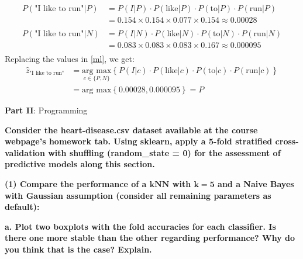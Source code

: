 \documentclass[12pt]{article}
\begin{document}
\begin{enumerate}[leftmargin=\labelsep]
    \begin{equation*}
        \begin{aligned}
            P(\text{"I like to run"}|P) &= P(I|P) \cdot P(\text{like}|P) \cdot P(\text{to}|P) \cdot P(\text{run}|P) \\
            &= 0.154 \times 0.154 \times 0.077 \times 0.154 \approx 0.00028\\
            \\
            P(\text{"I like to run"}|N) &= P(I|N) \cdot P(\text{like}|N) \cdot P(\text{to}|N) \cdot P(\text{run}|N) \\
            &= 0.083 \times 0.083 \times 0.083 \times 0.167 \approx 0.000095\\
        \end{aligned}
    \end{equation*}
    \vspace{10pt}
    Replacing the values in \eqref{ml}, we get:
    \begin{equation*}
        \begin{aligned}
            \hat{z}_{\text{"I like to run"}} &= \underset{c \in \{P,N\}}{\text{arg max}} \left\{P(I | c) \cdot P(\text{like}| c) \cdot P(\text{to}|c) \cdot P(\text{run}|c)\right\}\\
            &= \text{arg max} \left\{0.00028, 0.000095\right\} = P
        \end{aligned}
    \end{equation*}    

    \end{enumerate}

    \newpage

    \large{\textbf{Part II}: Programming}\normalsize

    \vspace{20pt}
    \textbf{Consider the heart-disease.csv dataset available at the course webpage's homework tab. Using sklearn, apply a 5-fold stratified cross-validation with shuffling (random\_state = 0) for the assessment of predictive models along this section.}

    \vspace{10pt}
    \textbf{(1) Compare the performance of a $\mathbf{kNN}$ with $\mathbf{k=5}$ and a Naive Bayes with Gaussian assumption (consider all remaining parameters as default):}

    \vspace{10pt}
    \textbf{a. Plot two boxplots with the fold accuracies for each classiﬁer. Is there one
    more stable than the other regarding performance? Why do you think that is the
    case? Explain.}
\end{document}
